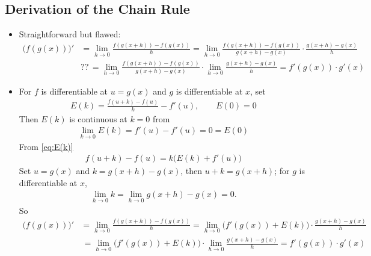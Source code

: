 \subsection*{Derivation of the Chain Rule}
\begin{itemize}
\item Straightforward but flawed:
\begin{align*}
\big(f(g(x))\big)' &= \lim_{h\to 0}\frac{f(g(x + h)) - f(g(x))}{h} = \lim_{h\to 0}\frac{f(g(x+h)) - f(g(x))}{g(x + h) - g(x)}\cdot\frac{g(x + h) - g(x)}{h} \\
& ??\,=\lim_{h\to 0}\frac{f(g(x+h)) - f(g(x))}{g(x + h) - g(x)}\cdot\lim_{h\to 0}\frac{g(x + h) - g(x)}{h} = f'(g(x))\cdot g'(x)
\end{align*}
\item For $f$ is differentiable at $u = g(x)$ and $g$ is differentiable at $x$, set
\begin{align}\label{eq:E(k)}
E(k) = \frac{f(u + k) - f(u)}{k} - f'(u), \qquad E(0) = 0
\end{align}
Then $E(k)$ is continuous at $k = 0$ from
\begin{align*}
\lim_{k\to 0}E(k) = f'(u) - f'(u) = 0 = E(0)
\end{align*}
From \eqref{eq:E(k)}
\begin{align*}
f(u + k) - f(u) = k\big(E(k) + f'(u)\big)
\end{align*}
Set $u = g(x)$ and $k = g(x + h) - g(x)$, then $u + k = g(x + h)$; for $g$ is differentiable at $x$,
\begin{align*}
\lim_{h\to 0}k = \lim_{h\to 0} g(x + h) - g(x) = 0.
\end{align*}
So
\begin{align*}
\big(f(g(x))\big)' &= \lim_{h\to 0}\frac{f(g(x + h)) - f(g(x))}{h} = \lim_{h\to 0}\big(f'(g(x)) + E(k)\big)\cdot\frac{g(x + h) - g(x)}{h} \\
&\,=\lim_{h\to 0}\big(f'(g(x)) + E(k)\big)\cdot\lim_{h\to 0}\frac{g(x + h) - g(x)}{h} = f'(g(x))\cdot g'(x)
\end{align*}
\end{itemize}
